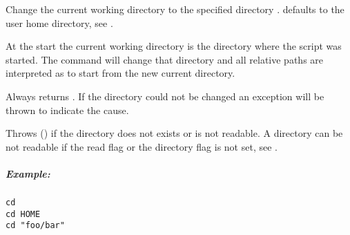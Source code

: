 \label{par:cd}

Change the current working directory to the specified directory .
 defaults to the user home directory, see .

At the start the current working directory is the directory where the script was started.
The command will change that directory and all relative paths are interpreted
as to start from the new current directory.

Always returns . If the directory could not be changed an
exception will be thrown to indicate the cause.

Throws  () if the directory does not exists or is not
readable. A directory can be not readable if the read flag or the directory flag
is not set, see .

\subparagraph{Example:}

\begin{lstlisting}[style=Groovybash, label={lst:example_cd}]
cd
cd HOME
cd "foo/bar"
\end{lstlisting}

